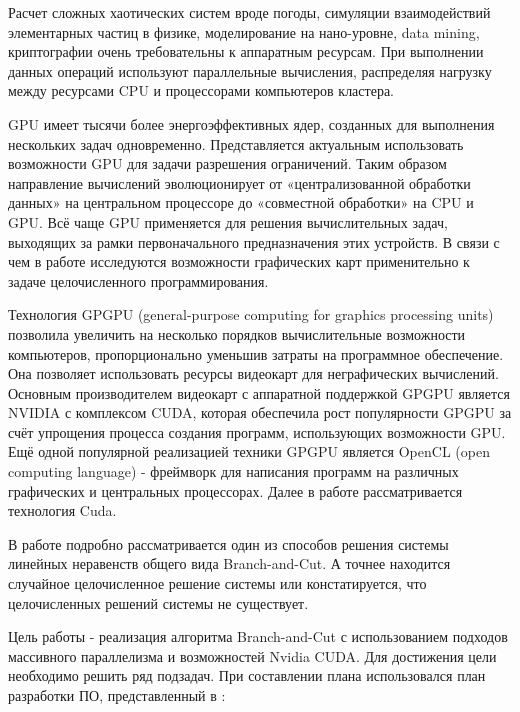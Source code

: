 \documentclass[a4paper,14pt,russian]{extreport}
\begin{document}
Расчет сложных хаотических систем вроде погоды, симуляции взаимодействий элементарных частиц в физике, моделирование на нано-уровне, data mining, криптографии очень требовательны к аппаратным ресурсам. При выполнении данных операций используют параллельные вычисления, распределяя нагрузку между ресурсами CPU и процессорами компьютеров кластера.
\par 
GPU имеет тысячи более энергоэффективных ядер, созданных для выполнения нескольких задач одновременно. Представляется актуальным использовать возможности GPU для задачи разрешения ограничений. Таким образом направление вычислений эволюционирует от «централизованной обработки данных» на центральном процессоре до «совместной обработки» на CPU и GPU. Всё чаще GPU применяется для решения вычислительных задач, выходящих за рамки первоначального предназначения этих устройств. В связи с чем в работе исследуются возможности графических карт применительно к задаче целочисленного программирования. 
\par
Технология GPGPU (general-purpose computing for graphics processing units) позволила увеличить на несколько порядков вычислительные возможности компьютеров, пропорционально уменьшив затраты на программное обеспечение. Она позволяет использовать ресурсы видеокарт для неграфических вычислений. Основным производителем видеокарт с аппаратной поддержкой GPGPU является NVIDIA с комплексом CUDA, которая обеспечила рост популярности GPGPU за счёт упрощения процесса создания программ, использующих возможности GPU. Ещё одной популярной реализацией техники GPGPU является OpenCL (open computing language) - фреймворк для написания программ на различных графических и центральных процессорах. Далее в работе рассматривается технология Cuda.
\par
В работе подробно рассматривается один из способов решения системы линейных неравенств общего вида Branch-and-Cut. А точнее находится случайное целочисленное решение системы или констатируется, что целочисленных решений системы не существует.  
\par 
Цель работы - реализация алгоритма Branch-and-Cut с использованием подходов массивного параллелизма и возможностей Nvidia CUDA. Для достижения цели необходимо решить ряд подзадач. При составлении плана использовался план разработки ПО, представленный в \cite{mcconnell}: 
\end{document}

